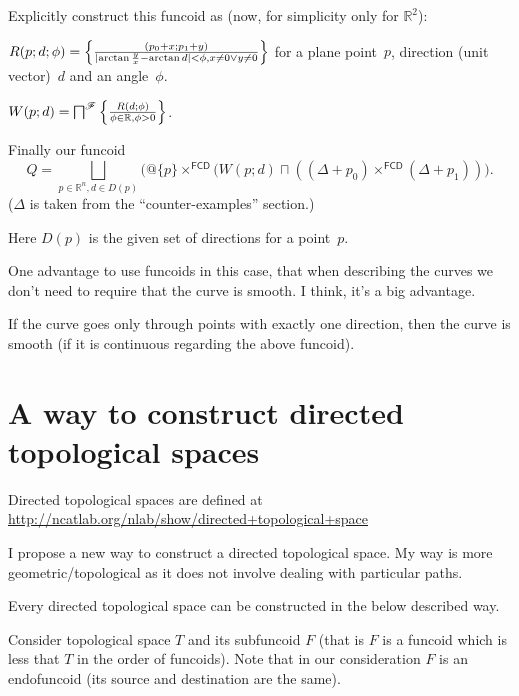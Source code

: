 Explicitly construct this funcoid as (now, for simplicity only for $\mathbb{R}^2$):

$R(p;d;\phi) = \left\{ \frac{(p_0+x;p_1+y)}{\lvert\arctan\frac{y}{x}-\arctan{d}\rvert<\phi, x\ne 0\lor y\ne 0}\right\}$  for a plane point~$p$, direction (unit vector)~$d$ and an angle~$\phi$.

$W(p;d) = \bigsqcap^{\mathscr{F}}\left\{ \frac{R(d;\phi)}{\phi\in\mathbb{R},\phi>0}\right\}$.

Finally our funcoid
\[Q=\bigsqcup_{p\in\mathbb{R}^n, d\in D(p)}
\bigl( @\{p\} \times^{\mathsf{FCD}} (W(p;d) \sqcap ((\Delta+p_0) \times^{\mathsf{FCD}} (\Delta+p_1)) \bigr).
\] ($\Delta$ is taken from the ``counter-examples'' section.)

Here $D(p)$ is the given set of directions for a point~$p$.

One advantage to use funcoids in this case, that when describing the curves we don't need to require that the curve is smooth. I think, it's a big advantage.


\begin{conjecture}
If the curve goes only through points with exactly one direction, then the curve is smooth (if it is continuous regarding the above funcoid).
\end{conjecture}

\section{A way to construct directed topological spaces}


Directed topological spaces are defined at\\
\url{http://ncatlab.org/nlab/show/directed+topological+space}

I propose a new way to construct a directed topological space. My way is more geometric/topological as it does not involve dealing with particular paths.

\begin{conjecture}
Every directed topological space can be constructed in the below described way.
\end{conjecture}

Consider topological space $T$ and its subfuncoid $F$ (that is $F$ is a funcoid which is less that $T$ in the order of funcoids).
Note that in our consideration $F$ is an endofuncoid (its source and destination are the same).


